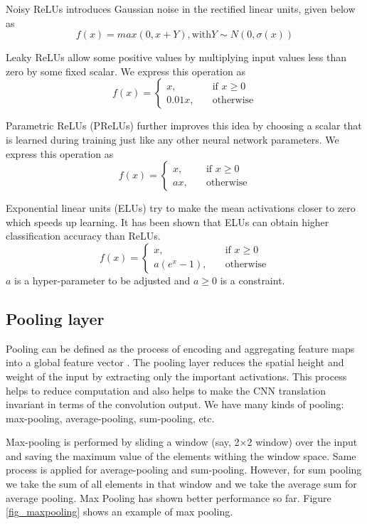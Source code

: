 \documentclass[master]{thesis-uestc}
\begin{document}
Noisy ReLUs introduces Gaussian noise in the rectified linear units, given below as
\[ f(x) = max(0, x + Y), \text{with} Y \sim N(0, \sigma(x))\]

Leaky ReLUs allow some positive values by multiplying input values less than zero by some fixed scalar. We express this operation as
\[ f(x) =
  \begin{cases}
    x, & \quad  \text{if } x \geq 0\\
    0.01x, & \quad \text{otherwise}
  \end{cases}
\]

Parametric ReLUs (PReLUs) further improves this idea by choosing a scalar that is learned during training just like any other neural network parameters. We express this operation as
\[ f(x) =
  \begin{cases}
    x, & \quad  \text{if } x \geq 0\\
    ax, & \quad \text{otherwise}
  \end{cases}
\]

Exponential linear units (ELUs) try to make the mean activations closer to zero which speeds up learning. It has been shown that ELUs can obtain higher classification accuracy than ReLUs.
\[ f(x) =
  \begin{cases}
    x, & \quad  \text{if } x \geq 0\\
    a(e^x - 1), & \quad \text{otherwise}
  \end{cases}
\]
$a$ is a hyper-parameter to be adjusted and $a \geq 0$ is a constraint.

\subsection{Pooling layer}
Pooling can be defined as the process of encoding and aggregating feature maps into a global feature vector \cite{cui2017cvpr}. The pooling layer reduces the spatial height and weight of the input by extracting only the important activations. This process helps to reduce computation and also helps to make the CNN translation invariant in terms of the convolution output. We have many kinds of pooling: max-pooling, average-pooling, sum-pooling, etc.

Max-pooling is performed by sliding a window (say, 2$\times$2 window) over the input and saving the maximum value of the elements withing the window space. Same process is applied for average-pooling and sum-pooling. However, for sum pooling we take the sum of all elements in that window and we take the average sum for average pooling. Max Pooling has shown better performance so far. Figure \ref{fig_maxpooling} shows an example of max pooling.
\end{document}
